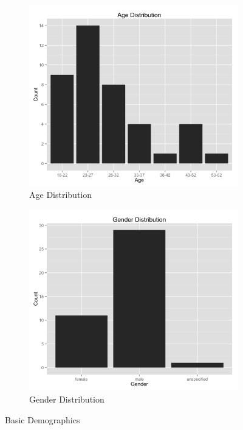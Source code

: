 \documentclass{article}
\begin{document}
\begin{figure}[t]
\centering
\begin{subfigure}{.5\textwidth}
    \centering
    \includegraphics[width=1.0\linewidth]{graphs/age.png}
    \caption{Age Distribution}
    \label{agedistribution}
\end{subfigure}%
\begin{subfigure}{.5\textwidth}
    \centering
    \includegraphics[width=1.0\linewidth]{graphs/gender.png}
    \caption{Gender Distribution}
    \label{genderdistribution}
\end{subfigure}
\caption{Basic Demographics}
\end{figure}
\end{document}
